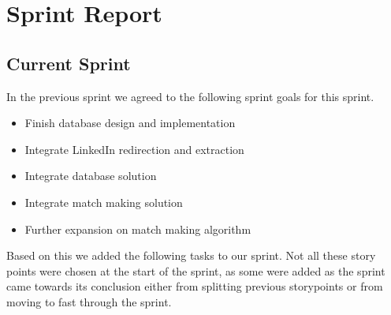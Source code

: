 \section{Sprint Report}

\subsection{Current Sprint}

In the previous sprint we agreed to the following sprint goals for this sprint. 
\begin{itemize}
    \item Finish database design and implementation
    \item Integrate LinkedIn redirection and extraction
    \item Integrate database solution
    \item Integrate match making solution
    \item Further expansion on match making algorithm
\end{itemize}
Based on this we added the following tasks to our sprint. Not all these story points were chosen at the start of the 
sprint, as some were added as the sprint came towards its conclusion either from splitting previous storypoints or 
from moving to fast through the sprint.


